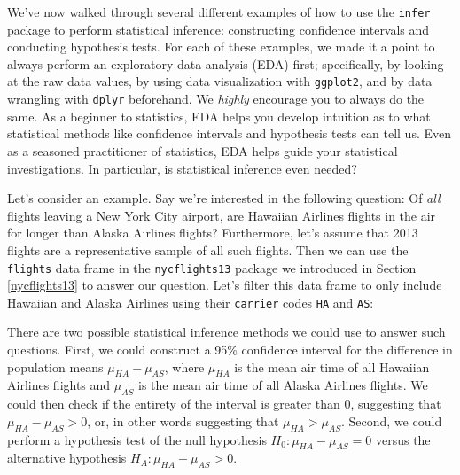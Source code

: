 \documentclass[
]{book}
\newenvironment{Shaded}{\begin{snugshade}}{\end{snugshade}}
\newcommand{\KeywordTok}[1]{\textcolor[rgb]{0.13,0.29,0.53}{\textbf{#1}}}
\newcommand{\NormalTok}[1]{#1}
\newcommand{\OperatorTok}[1]{\textcolor[rgb]{0.81,0.36,0.00}{\textbf{#1}}}
\newcommand{\StringTok}[1]{\textcolor[rgb]{0.31,0.60,0.02}{#1}}
\begin{document}
We've now walked through several different examples of how to use the \texttt{infer} package to perform statistical inference: constructing confidence intervals and conducting hypothesis tests. For each of these examples, we made it a point to always perform an exploratory data analysis (EDA) first; specifically, by looking at the raw data values, by using data visualization with \texttt{ggplot2}, and by data wrangling with \texttt{dplyr} beforehand. We \emph{highly} encourage you to always do the same. As a beginner to statistics, EDA helps you develop intuition as to what statistical methods like confidence intervals and hypothesis tests can tell us. Even as a seasoned practitioner of statistics, EDA helps guide your statistical investigations. In particular, is statistical inference even needed?

Let's consider an example. Say we're interested in the following question: Of \emph{all} flights leaving a New York City airport, are Hawaiian Airlines flights in the air for longer than Alaska Airlines flights? Furthermore, let's assume that 2013 flights are a representative sample of all such flights. Then we can use the \texttt{flights} data frame in the \texttt{nycflights13}  package we introduced in Section \ref{nycflights13} to answer our question. Let's filter this data frame to only include Hawaiian and Alaska Airlines using their \texttt{carrier} codes \texttt{HA} and \texttt{AS}:

\begin{Shaded}
\end{Shaded}

There are two possible statistical inference methods we could use to answer such questions. First, we could construct a 95\% confidence interval for the difference in population means \(\mu_{HA} - \mu_{AS}\), where \(\mu_{HA}\) is the mean air time of all Hawaiian Airlines flights and \(\mu_{AS}\) is the mean air time of all Alaska Airlines flights. We could then check if the entirety of the interval is greater than 0, suggesting that \(\mu_{HA} - \mu_{AS} > 0\), or, in other words suggesting that \(\mu_{HA} > \mu_{AS}\). Second, we could perform a hypothesis test of the null hypothesis \(H_0: \mu_{HA} - \mu_{AS} = 0\) versus the alternative hypothesis \(H_A: \mu_{HA} - \mu_{AS} > 0\).
\end{document}
